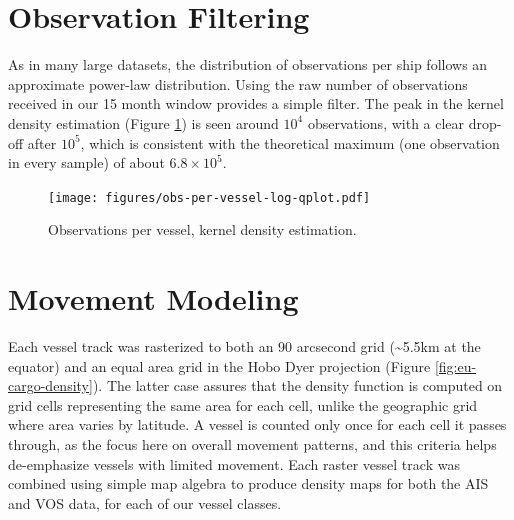 \section{Observation Filtering}
As in many large datasets, the distribution of observations per ship follows an approximate power-law distribution. Using the raw number of observations received in our 15 month window provides a simple filter. The peak in the kernel density estimation (Figure \ref{fig:obs-per-vessel-log}) is seen around $10^4$ observations, with a clear drop-off after $10^5$, which is consistent with the theoretical maximum (one observation in every sample) of about $6.8 \times 10^5$.
\begin{figure}[htbp]
  \centering
  \texttt{[image: figures/obs-per-vessel-log-qplot.pdf]}
  \caption[Observations per vessel]{Observations per vessel, kernel density estimation.}
  \label{fig:obs-per-vessel-log}
\end{figure}

\section{Movement Modeling}
\label{sec:movement-modeling-appendix}


Each vessel track was rasterized to both an 90 arcsecond grid (\textasciitilde{}5.5km at the equator) and an equal area grid in the Hobo Dyer projection (Figure \ref{fig:eu-cargo-density}). The latter case assures that the density function is computed on grid cells representing the same area for each cell, unlike the geographic grid where area varies by latitude. A vessel is counted only once for each cell it passes through, as the focus here on overall movement patterns, and this criteria helps de-emphasize vessels with limited movement. Each raster vessel track was combined using simple map algebra to produce density maps for both the AIS and VOS data, for each of our vessel classes. %

